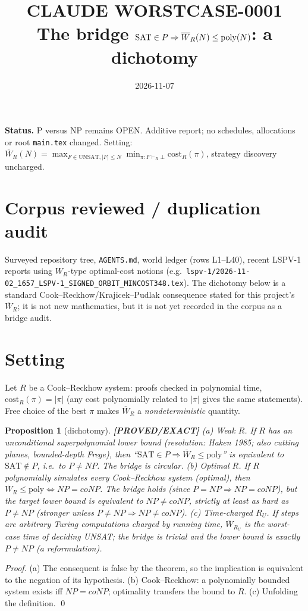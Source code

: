 \documentclass[11pt]{article}
\title{CLAUDE WORSTCASE-0001\\[2pt]\large The bridge $\SAT\in P\Rightarrow \overline W_R(N)\le\mathrm{poly}(N)$: a dichotomy}
\date{2026-11-07}
\newtheorem{proposition}[theorem]{Proposition}
\newcommand{\status}[1]{\textbf{[#1]}}
\newcommand{\SAT}{\mathrm{SAT}}
\begin{document}
\maketitle
\noindent\textbf{Status.} P versus NP remains OPEN. Additive report; no schedules, allocations or root \texttt{main.tex} changed.
Setting: $\overline W_R(N)=\max_{F\in\mathrm{UNSAT},|F|\le N}\min_{\pi:F\vdash_R\bot}\mathrm{cost}_R(\pi)$, strategy discovery uncharged.

\section*{Corpus reviewed / duplication audit}
Surveyed repository tree, \texttt{AGENTS.md}, world ledger (rows L1--L40), recent LSPV-1 reports using $W_R$-type optimal-cost notions
(e.g.\ \texttt{lspv-1/2026-11-02\_1657\_LSPV-1\_SIGNED\_ORBIT\_MINCOST348.tex}). The dichotomy below is a standard
Cook--Reckhow/Krajicek--Pudlak consequence stated for this project's $\overline W_R$; it is not new mathematics, but it is not
yet recorded in the corpus as a bridge audit.

\section{Setting}
Let $R$ be a Cook--Reckhow system: proofs checked in polynomial time, $\mathrm{cost}_R(\pi)=|\pi|$ (any cost polynomially related to $|\pi|$ gives the same statements).
Free choice of the best $\pi$ makes $\overline W_R$ a \emph{nondeterministic} quantity.

\begin{proposition}[dichotomy]\label{p:d}
\status{PROVED/EXACT}
(a) \emph{Weak $R$.} If $R$ has an unconditional superpolynomial lower bound (resolution: Haken 1985; also cutting planes, bounded-depth Frege), then
``$\SAT\in P\Rightarrow\overline W_R\le\mathrm{poly}$'' is equivalent to $\SAT\notin P$, i.e.\ to $P\ne NP$. The bridge is circular.
(b) \emph{Optimal $R$.} If $R$ polynomially simulates every Cook--Reckhow system (optimal), then $\overline W_R\le \mathrm{poly}\iff NP=coNP$.
The bridge holds (since $P=NP\Rightarrow NP=coNP$), but the target lower bound is \emph{equivalent to $NP\ne coNP$}, strictly at least as hard as $P\ne NP$ (stronger unless $P\ne NP\Rightarrow NP\neq coNP$).
(c) \emph{Time-charged $R_U$.} If steps are arbitrary Turing computations charged by running time, $\overline W_{R_U}$ is the worst-case time of deciding UNSAT; the bridge is trivial and the lower bound is exactly $P\ne NP$ (a reformulation).
\end{proposition}
\begin{proof}
(a) The consequent is false by the theorem, so the implication is equivalent to the negation of its hypothesis. (b) Cook--Reckhow: a polynomially bounded system exists iff $NP=coNP$; optimality transfers the bound to $R$.
(c) Unfolding the definition. \qed
\end{proof}
\end{document}
